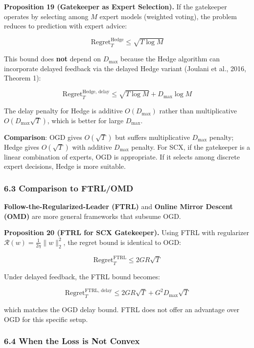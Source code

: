 \documentclass[
  12pt,
]{article}
\begin{document}
\textbf{Proposition 19 (Gatekeeper as Expert Selection).} If the
gatekeeper operates by selecting among \(M\) expert models (weighted
voting), the problem reduces to prediction with expert advice:

\[\text{Regret}_T^{\text{Hedge}} \leq \sqrt{T \log M}\]

This bound does \textbf{not} depend on \(D_{\max}\) because the Hedge
algorithm can incorporate delayed feedback via the delayed Hedge variant
(Joulani et al., 2016, Theorem 1):

\[\text{Regret}_T^{\text{Hedge, delay}} \leq \sqrt{T \log M} + D_{\max} \log M\]

The delay penalty for Hedge is additive \(O(D_{\max})\) rather than
multiplicative \(O(D_{\max}\sqrt{T})\), which is better for large
\(D_{\max}\).

\textbf{Comparison}: OGD gives \(O(\sqrt{T})\) but suffers
multiplicative \(D_{\max}\) penalty; Hedge gives \(O(\sqrt{T})\) with
additive \(D_{\max}\) penalty. For SCX, if the gatekeeper is a linear
combination of experts, OGD is appropriate. If it selects among discrete
expert decisions, Hedge is more suitable.

\subsubsection{6.3 Comparison to FTRL/OMD}\label{comparison-to-ftrlomd}

\textbf{Follow-the-Regularized-Leader (FTRL)} and \textbf{Online Mirror
Descent (OMD)} are more general frameworks that subsume OGD.

\textbf{Proposition 20 (FTRL for SCX Gatekeeper).} Using FTRL with
regularizer \(\mathcal{R}(w) = \frac{1}{2\eta}\|w\|_2^2\), the regret
bound is identical to OGD:

\[\text{Regret}_T^{\text{FTRL}} \leq 2GR\sqrt{T}\]

Under delayed feedback, the FTRL bound becomes:

\[\text{Regret}_T^{\text{FTRL, delay}} \leq 2GR\sqrt{T} + G^2 D_{\max} \sqrt{T}\]

which matches the OGD delay bound. FTRL does not offer an advantage over
OGD for this specific setup.

\subsubsection{6.4 When the Loss is Not
Convex}\label{when-the-loss-is-not-convex}
\end{document}
